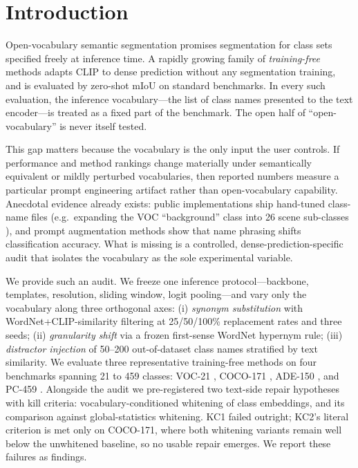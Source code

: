 \documentclass[11pt]{article}
\newcommand{\miou}{mIoU}
\begin{document}
\section{Introduction}

Open-vocabulary semantic segmentation promises segmentation for class sets specified
freely at inference time. A rapidly growing family of \emph{training-free} methods
\citep{zhou2022maskclip,wang2024sclip,lan2024clearclip,hajimiri2024naclip,lan2024proxyclip}
adapts CLIP \citep{radford2021clip} to dense prediction without any segmentation
training, and is evaluated by zero-shot \miou{} on standard benchmarks. In every such
evaluation, the inference vocabulary---the list of class names presented to the text
encoder---is treated as a fixed part of the benchmark. The open half of
``open-vocabulary'' is never itself tested.

This gap matters because the vocabulary is the only input the user controls. If
performance and method rankings change materially under semantically equivalent or
mildly perturbed vocabularies, then reported numbers measure a particular prompt
engineering artifact rather than open-vocabulary capability. Anecdotal evidence already
exists: public implementations ship hand-tuned class-name files (e.g.\ expanding the
VOC ``background'' class into 26 scene sub-classes \citep{wang2024sclip}), and prompt
augmentation methods \citep{roth2023waffle,pratt2023cupl} show that name phrasing shifts
classification accuracy. What is missing is a controlled, dense-prediction-specific
audit that isolates the vocabulary as the sole experimental variable.

We provide such an audit. We freeze one inference protocol---backbone, templates,
resolution, sliding window, logit pooling---and vary only the vocabulary along three
orthogonal axes: (i) \emph{synonym substitution} with WordNet+CLIP-similarity filtering
at 25/50/100\% replacement rates and three seeds; (ii) \emph{granularity shift} via a
frozen first-sense WordNet hypernym rule; (iii) \emph{distractor injection} of 50--200
out-of-dataset class names stratified by text similarity. We evaluate three
representative training-free methods on four benchmarks spanning 21 to 459 classes:
VOC-21 \citep{everingham2010voc}, COCO-171 \citep{lin2014coco,caesar2018cocostuff},
ADE-150 \citep{zhou2017ade}, and PC-459 \citep{mottaghi2014context}.
Alongside the audit we pre-registered two text-side repair hypotheses with kill
criteria: vocabulary-conditioned whitening of class embeddings, and its comparison
against global-statistics whitening. KC1 failed outright; KC2's literal criterion is
met only on COCO-171, where both whitening variants remain well below the unwhitened
baseline, so no usable repair emerges. We report these failures as findings.
\end{document}
